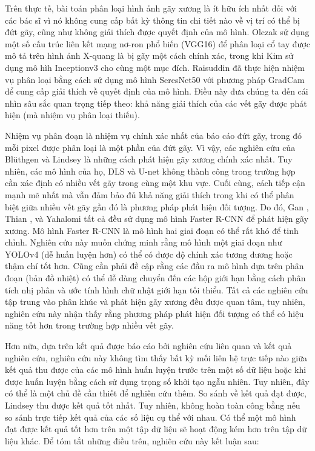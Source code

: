 \documentclass[../the.tex]{subfiles}
\begin{document}
{\fontsize{13}{12} \selectfont
Trên thực tế, bài toán phân loại hình ảnh gãy xương là ít hữu ích nhất đối với các bác sĩ vì nó không cung cấp bất kỳ thông tin chi tiết nào về vị trí có thể bị đứt gãy, cũng như không giải thích được quyết định của mô hình. Olczak \etal \cite{Olczak2017} sử dụng một số cấu trúc liên kết mạng nơ-ron phổ biến (VGG16) để phân loại cổ tay được mô tả trên hình ảnh X-quang là bị gãy một cách chính xác, trong khi Kim \etal \cite{Kim2018} sử dụng mô hìh Inceptionv3 cho cùng một mục đích. Raisuddin \etal \cite{Raisuddin2021} đã thực hiện nhiệm vụ phân loại bằng cách sử dụng mô hình SeresNet50 với phương pháp GradCam để cung cấp giải thích về quyết định của mô hình. Điều này đưa chúng ta đến cái nhìn sâu sắc quan trọng tiếp theo: khả năng giải thích của các vết gãy được phát hiện (mà nhiệm vụ phân loại thiếu). 

Nhiệm vụ phân đoạn là nhiệm vụ chính xác nhất của báo cáo đứt gãy, trong đó mỗi pixel được phân loại là một phần của đứt gãy. Vì vậy, các nghiên cứu của Bl\"{u}thgen \etal \cite{Blthgen2020} và Lindsey \etal \cite{Lindsey1806905115} là những cách phát hiện gãy xương chính xác nhất. Tuy nhiên, các mô hình của họ, DLS và U-net không thành công trong trường hợp cần xác định có nhiều vết gãy trong cùng một khu vực. Cuối cùng, cách tiếp cận mạnh mẽ nhất mà vẫn đảm bảo đủ khả năng giải thích trong khi có thể phân biệt giữa nhiều vết gãy gần đó là phương pháp phát hiện đối tượng. Do đó, Gan \etal \cite{Gan2019}, Thian \etal \cite{Thian2019}, và Yahalomi \etal \cite{Yahalomi2019DetectionOD} tất cả đều sử dụng mô hình Faster R-CNN để phát hiện gãy xương. Mô hình Faster R-CNN là mô hình hai giai đoạn có thể rất khó để tinh chỉnh. Nghiên cứu này muốn chứng minh rằng mô hình một giai đoạn như YOLOv4 (dễ huấn luyện hơn) có thể có được độ chính xác tương đương hoặc thậm chí tốt hơn. Cũng cần phải đề cập rằng các đầu ra mô hình dựa trên phân đoạn (bản đồ nhiệt) có thể dễ dàng chuyển đến các hộp giới hạn bằng cách phân tích nhị phân và ước tính hình chữ nhật giới hạn tối thiểu. Tất cả các nghiên cứu tập trung vào phân khúc và phát hiện gãy xương đều được quan tâm, tuy nhiên, nghiên cứu này nhận thấy rằng phương pháp phát hiện đối tượng có thể có hiệu năng tốt hơn trong trường hợp nhiều vết gãy. 

Hơn nữa, dựa trên kết quả được báo cáo bởi nghiên cứu liên quan và kết quả nghiên cứu, nghiên cứu này không tìm thấy bất kỳ mối liên hệ trực tiếp nào giữa kết quả thu được của các mô hình huấn luyện trước trên một số dữ liệu hoặc khi được huấn luyện bằng cách sử dụng trọng số khởi tạo ngẫu nhiên. Tuy nhiên, đây có thể là một chủ đề cần thiết để nghiên cứu thêm. So sánh về kết quả đạt được, Lindsey\etal \cite{Lindsey1806905115} thu được kết quả tốt nhất. Tuy nhiên, không hoàn toàn công bằng nếu so sánh trực tiếp kết quả của các số liệu cụ thể với nhau. Có thể một mô hình đạt được kết quả tốt hơn trên một tập dữ liệu sẽ hoạt động kém hơn trên tập dữ liệu khác. Để tóm tắt những điều trên, nghiên cứu này kết luận sau:

}
\end{document}
